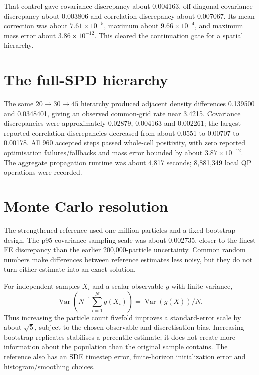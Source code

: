 That control gave covariance discrepancy about 0.004163, off-diagonal covariance discrepancy about 0.003806 and correlation discrepancy about 0.007067. Its mean correction was about $7.61\times10^{-5}$, maximum about $9.66\times10^{-4}$, and maximum mass error about $3.86\times10^{-12}$. This cleared the continuation gate for a spatial hierarchy.

\section{The full-SPD hierarchy}
The same $20\to30\to45$ hierarchy produced adjacent density differences 0.139500 and 0.0348401, giving an observed common-grid rate near 3.4215. Covariance discrepancies were approximately 0.02879, 0.004163 and 0.002261; the largest reported correlation discrepancies decreased from about 0.0551 to 0.00707 to 0.00178. All 960 accepted steps passed whole-cell positivity, with zero reported optimisation failures/fallbacks and mass error bounded by about $3.87\times10^{-12}$. The aggregate propagation runtime was about 4,817 seconds; 8,881,349 local QP operations were recorded.


\section{Monte Carlo resolution}
The strengthened reference used one million particles and a fixed bootstrap design. The p95 covariance sampling scale was about 0.002735, closer to the finest FE discrepancy than the earlier 200,000-particle uncertainty. Common random numbers make differences between reference estimates less noisy, but they do not turn either estimate into an exact solution.

For independent samples $X_i$ and a scalar observable $g$ with finite variance,
\begin{equation}
 \operatorname{Var}\left(N^{-1}\sum_{i=1}^{N}g(X_i)\right)
 =\operatorname{Var}(g(X))/N.
\end{equation}
Thus increasing the particle count fivefold improves a standard-error scale by about $\sqrt5$, subject to the chosen observable and discretisation bias. Increasing bootstrap replicates stabilises a percentile estimate; it does not create more information about the population than the original sample contains. The reference also has an SDE timestep error, finite-horizon initialization error and histogram/smoothing choices.

